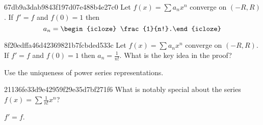 \begin{note}{67db9a3dab9843f197d07e488b4e27c0}
    Let \({ f(x) = \sum a_n x^{n} }\) converge on \({ (-R, R) }\). If \({ f' = f }\) and \({ f(0) = 1 }\) then
    \[
        a_n = \begin{icloze}{1}\frac{1}{n!}.\end{icloze}
    \]
\end{note}

\begin{note}{8f20edffa46d42369821b7fcbded533c}
    Let \({ f(x) = \sum a_n x^{n} }\) converge on \({ (-R, R) }\). If \({ f' = f }\) and \({ f(0) = 1 }\) then \({ a_n = \frac{1}{n!} }\).
    What is the key idea in the proof?

    \begin{cloze}{1}
        Use the uniqueness of power series representations.
    \end{cloze}
\end{note}

\begin{note}{21136fe33d9e42959f29e35d7bf271f6}
    What is notably special about the series \({ f(x) = \sum \frac{1}{n!} x^{n} }\)?

    \begin{cloze}{1}
        \({ f' = f }\).
    \end{cloze}
\end{note}


